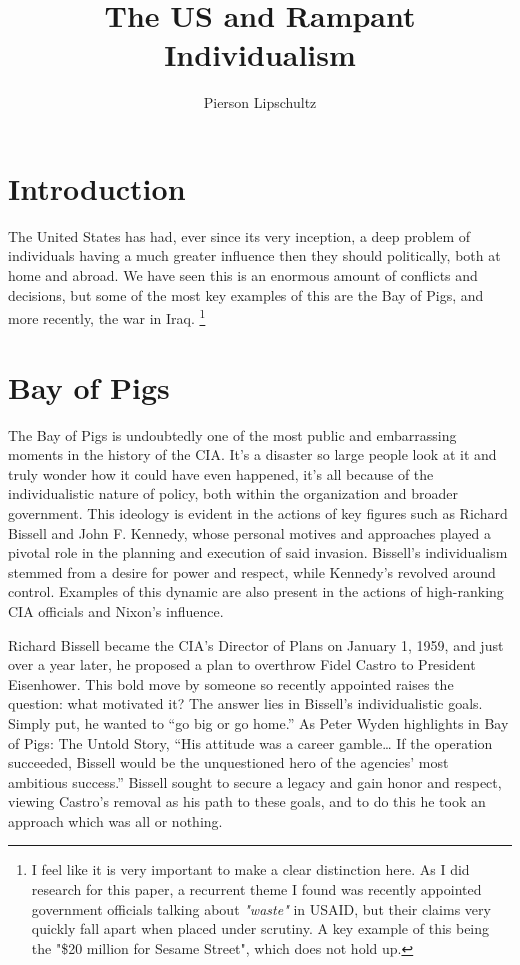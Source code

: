 \documentclass{article}
\title{The US and Rampant Individualism }
\author{Pierson Lipschultz}
\begin{document}
\maketitle



\section{Introduction}
    The United States has had, ever since its very inception, a deep problem of individuals having a much greater influence then they should politically, both at home and abroad. We have seen this is an enormous amount of conflicts and decisions, but some of the most key examples of this are the Bay of Pigs, and more recently, the war in Iraq. \footnote{I feel like it is very important to make a clear distinction here. As I did research for this paper, a recurrent  theme I found was recently appointed government officials talking about \textit{"waste"} in USAID, but their claims very quickly fall apart when placed under scrutiny. A key example of this being the "\$20 million for Sesame Street", which does not hold up.}

    \cite{CWC_2011}

\section{Bay of Pigs}
    The Bay of Pigs is undoubtedly one of the most public and embarrassing moments in the history of the CIA. It's a disaster so large people look at it and truly wonder how it could have even happened, it's all because of the individualistic nature of policy, both within the organization and broader government. This ideology is evident in the actions of key figures such as Richard Bissell and John F. Kennedy, whose personal motives and approaches played a pivotal role in the planning and execution of said invasion. Bissell's individualism stemmed from a desire for power and respect, while Kennedy's revolved around control. Examples of this dynamic are also present in the actions of high-ranking CIA officials and Nixon's influence.

    Richard Bissell became the CIA's Director of Plans on January 1, 1959, and just over a year later, he proposed a plan to overthrow Fidel Castro to President Eisenhower. This bold move by someone so recently appointed raises the question: what motivated it? The answer lies in Bissell's individualistic goals. Simply put, he wanted to “go big or go home.” As Peter Wyden highlights in Bay of Pigs: The Untold Story, “His attitude was a career gamble… If the operation succeeded, Bissell would be the unquestioned hero of the agencies' most ambitious success.” Bissell sought to secure a legacy and gain honor and respect, viewing Castro's removal as his path to these goals, and to do this he took an approach which was all or nothing.
\end{document}
